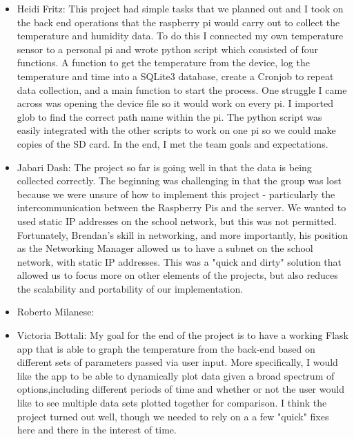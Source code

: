\documentclass{article}
\begin{document}
\begin{itemize}
				
				\item Heidi Fritz: This project had simple tasks that we planned out and I took on the back end operations that the raspberry pi would 
				carry out to collect the temperature and humidity data.  To do this I connected my own temperature sensor to a personal pi and wrote 
				python script which consisted of four functions.  A function to get the temperature from the device, log the temperature and time into a 
				SQLite3 database, create a Cronjob to repeat data collection, and a main function to start the process.  One struggle I came across was 
				opening the device file so it would work on every pi.  I imported glob to find the correct path name within the pi.  The python script 
				was easily integrated with the other scripts to work on one pi so we could make copies of the SD card.  In the end, I met the team goals 
				and expectations.
				\item Jabari Dash: The project so far is going well in that the data is being collected correctly.
									The beginning was challenging in that the group was lost because we were unsure of how to 
									implement this project - particularly the intercommunication between the 
									Raspberry Pis and the server. We wanted to used static IP addresses on the 
									school network, but this was not permitted. Fortunately, Brendan's skill in networking,
									and more importantly, his position as the Networking Manager allowed us to have a subnet
									on the school network, with static IP addresses. This was a "quick and dirty" solution that 
									allowed us to focus more on other elements of the projects, but also reduces the scalability
									and portability of our implementation.
				\item Roberto Milanese:
				\item Victoria Bottali:	My goal for the end of the project is to have a working Flask app that is able to graph 
										the temperature from the back-end based on different sets of parameters passed via user input. More 				
										specifically, I would like the app to be able to dynamically plot data given a broad spectrum of 
										options,including different periods of time and whether or not the user would like to see multiple data sets 
										plotted together for comparison. I think the project turned out well, though we needed 
										to rely on a a few "quick" fixes here and there in the interest of time.   	
			\end{itemize}
			
\end{document}
